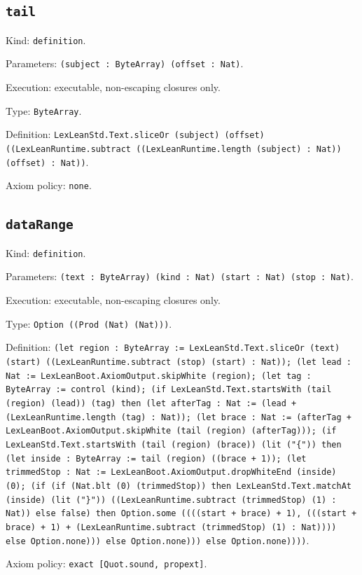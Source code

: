 \documentclass[11pt]{article}
\begin{document}
\subsection*{\texttt{tail}}
\noindent Kind: \texttt{definition}.\par
\noindent Parameters: \texttt{(subject : ByteArray) (offset : Nat)}.\par
\noindent Execution: executable, non-escaping closures only.\par
\noindent Type: \texttt{ByteArray}.\par
\noindent Definition: \texttt{LexLeanStd.Text.sliceOr (subject) (offset) ((LexLeanRuntime.subtract ((LexLeanRuntime.length (subject) : Nat)) (offset) : Nat))}.\par
\noindent Axiom policy: \texttt{none}.\par
\subsection*{\texttt{dataRange}}
\noindent Kind: \texttt{definition}.\par
\noindent Parameters: \texttt{(text : ByteArray) (kind : Nat) (start : Nat) (stop : Nat)}.\par
\noindent Execution: executable, non-escaping closures only.\par
\noindent Type: \texttt{Option ((Prod (Nat) (Nat)))}.\par
\noindent Definition: \texttt{(let region : ByteArray := LexLeanStd.Text.sliceOr (text) (start) ((LexLeanRuntime.subtract (stop) (start) : Nat)); (let lead : Nat := LexLeanBoot.AxiomOutput.skipWhite (region); (let tag : ByteArray := control (kind); (if LexLeanStd.Text.startsWith (tail (region) (lead)) (tag) then (let afterTag : Nat := (lead + (LexLeanRuntime.length (tag) : Nat)); (let brace : Nat := (afterTag + LexLeanBoot.AxiomOutput.skipWhite (tail (region) (afterTag))); (if LexLeanStd.Text.startsWith (tail (region) (brace)) (lit ("\{")) then (let inside : ByteArray := tail (region) ((brace + 1)); (let trimmedStop : Nat := LexLeanBoot.AxiomOutput.dropWhiteEnd (inside) (0); (if (if (Nat.blt (0) (trimmedStop)) then LexLeanStd.Text.matchAt (inside) (lit ("\}")) ((LexLeanRuntime.subtract (trimmedStop) (1) : Nat)) else false) then Option.some ((((start + brace) + 1), (((start + brace) + 1) + (LexLeanRuntime.subtract (trimmedStop) (1) : Nat)))) else Option.none))) else Option.none))) else Option.none))))}.\par
\noindent Axiom policy: \texttt{exact [Quot.sound, propext]}.\par
\end{document}

